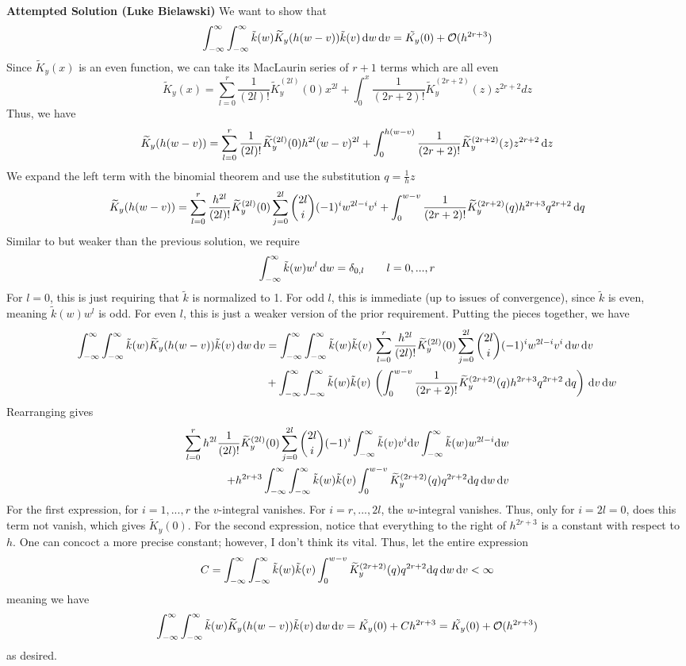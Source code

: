 \documentclass[letterpaper]{amsart}
\newcommand{\tKY}{\widetilde{K}_y}
\newcommand{\tk}{\tilde{k}}
\begin{document}
\textbf{Attempted Solution (Luke Bielawski)}
We want to show that
\[
\int_{-\infty}^\infty \int_{-\infty}^\infty \tk(w) \tKY(h(w-v)) \tk(v) \, \dif w \, \dif v = \tilde{K_y}(0) + \Order(h^{2r+3})
\]
Since $\tKY(x)$ is an even function, we can take its MacLaurin series of $r+1$ terms which are all even
\[
\tKY(x) = \sum_{l=0}^r \frac{1}{(2l)!}\tKY^{(2l)}(0) x^{2l} + \int_0^x \frac{1}{(2r+2)!}\tKY^{(2r+2)}(z) z^{2r+2}dz
\]
Thus, we have
\[
\tKY(h(w-v)) = \sum_{l=0}^r \frac{1}{(2l)!}\tKY^{(2l)}(0) h^{2l}(w-v)^{2l} + \int_0^{h(w-v)} \frac{1}{(2r+2)!}\tKY^{(2r+2)}(z) z^{2r+2} \, \dif z
\]
We expand the left term with the binomial theorem and use the substitution $q = \frac{1}{h}z$
\[
\tKY(h(w-v)) = \sum_{l=0}^r \frac{h^{2l}}{(2l)!}\tKY^{(2l)}(0) \sum_{j=0}^{2l}\binom{2l}{i}(-1)^iw^{2l-i}v^i + \int_0^{w-v} \frac{1}{(2r+2)!}\tKY^{(2r+2)}(q) h^{2r+3}q^{2r+2} \,\dif q
\]
Similar to but weaker than the previous solution, we require
\[
\int_{-\infty}^\infty \tk(w)w^l \, \dif w = \delta_{0, l} \qquad  l = 0, ..., r
\]
For $l = 0$, this is just requiring that $\tk$ is normalized to 1. For odd $l$, this is immediate (up to issues of convergence), since $\tk$ is even, meaning $\tk(w)w^l$ is odd. For even $l$, this is just a weaker version of the prior requirement. Putting the pieces together, we have
\begin{align*}
    \int_{-\infty}^\infty \int_{-\infty}^\infty \tk(w) \tKY(h(w-v)) \tk(v) \, \dif w \, \dif v &= \int_{-\infty}^\infty \int_{-\infty}^\infty \tk(w) \tk(v) \, \sum_{l=0}^r \frac{h^{2l}}{(2l)!}\tKY^{(2l)}(0) \sum_{j=0}^{2l}\binom{2l}{i}(-1)^iw^{2l-i}v^i \, \dif w \, \dif v \\
    &+ \int_{-\infty}^\infty \int_{-\infty}^\infty \tk(w) \tk(v) \,\left(\int_0^{w-v} \frac{1}{(2r+2)!}\tKY^{(2r+2)}(q) h^{2r+3}q^{2r+2} \,\dif q\right) \, \dif v \, \dif w
\end{align*}
Rearranging gives
\begin{align*}
    \sum_{l=0}^r h^{2l}\frac{1}{(2l)!}\tKY^{(2l)}(0) \sum_{j=0}^{2l}\binom{2l}{i}(-1)^i \int_{-\infty}^\infty  \tk(v) v^i \dif v\int_{-\infty}^\infty \tk(w) w^{2l-i} \dif w \\
    + h^{2r+3} \int_{-\infty}^\infty \int_{-\infty}^\infty \tk(w) \tk(v) \int_0^{w-v}
 \tKY^{(2r+2)}(q)q^{2r+2} \dif q \, \dif w \, \dif v
\end{align*}
For the first expression, for $i = 1, ..., r$ the $v$-integral vanishes. For $i = r, ..., 2l$, the $w$-integral vanishes. Thus, only for $i = 2l = 0$, does this term not vanish, which gives $\tKY(0)$. For the second expression, notice that everything to the right of $h^{2r+3}$ is a constant with respect to $h$. One can concoct a more precise constant; however, I don't think its vital. Thus, let the entire expression
\[
C = \int_{-\infty}^\infty \int_{-\infty}^\infty \tk(w) \tk(v) \int_0^{w-v}
 \tKY^{(2r+2)}(q)q^{2r+2} \dif q \, \dif w \, \dif v < \infty
\]
meaning we have
\[
    \int_{-\infty}^\infty \int_{-\infty}^\infty \tk(w) \tKY(h(w-v)) \tk(v) \, \dif w \, \dif v = \tilde{K_y}(0) + Ch^{2r+3} = \tilde{K_y}(0) + \Order(h^{2r+3})
\]
as desired.
\end{document}
